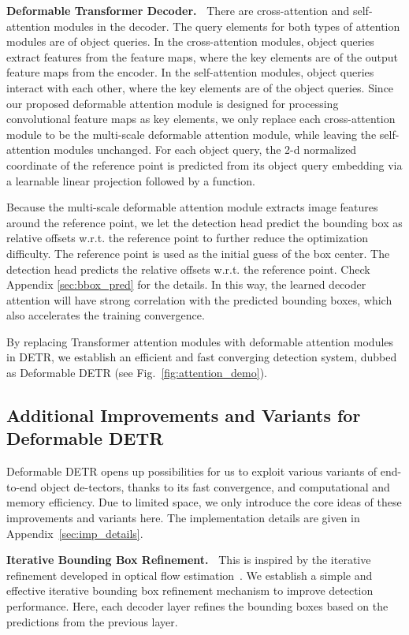 \documentclass{article}
\begin{document}
\textbf{Deformable Transformer Decoder.~} 
There are cross-attention and self-attention modules in the decoder.
The query elements for both types of attention modules are of object queries. 
In the cross-attention modules, object queries extract features from the feature maps, where the key elements are of the output feature maps from the encoder. In the self-attention modules, object queries interact with each other, where the key elements are of the object queries.
Since our proposed deformable attention module is designed for processing convolutional feature maps as key elements, we only replace each cross-attention module to be the multi-scale deformable attention module, while leaving the self-attention modules unchanged.
For each object query, the 2-d normalized coordinate of the reference point  is predicted from its object query embedding via a learnable linear projection followed by a  function.

Because the multi-scale deformable attention module extracts image features around the reference point, we let the detection head predict the bounding box as relative offsets w.r.t. the reference point to further reduce the optimization difficulty. The reference point is used as the initial guess of the box center. The detection head predicts the relative offsets w.r.t. the reference point. Check Appendix \ref{sec:bbox_pred} for the details. In this way, the learned decoder attention will have strong correlation with the predicted bounding boxes, which also accelerates the training convergence.

By replacing Transformer attention modules with deformable attention modules in DETR, we establish an efficient and fast converging detection system, dubbed as Deformable DETR (see Fig.~\ref{fig:attention_demo}).

\subsection{Additional Improvements and Variants for Deformable DETR}
\label{sec:improve}

Deformable DETR opens up possibilities for us to exploit various variants of end-to-end object de-tectors, thanks to its fast convergence, and computational and memory efficiency. Due to limited space, we only introduce the core ideas of these improvements and variants here. The implementation details are given in Appendix~\ref{sec:imp_details}.

\textbf{Iterative Bounding Box Refinement.~}
This is inspired by the iterative refinement developed in optical flow estimation~\citep{teed2020raft}.
We establish a simple and effective iterative bounding box refinement mechanism to improve detection performance. Here, each decoder layer refines the bounding boxes based on the predictions from the previous layer.
\end{document}

